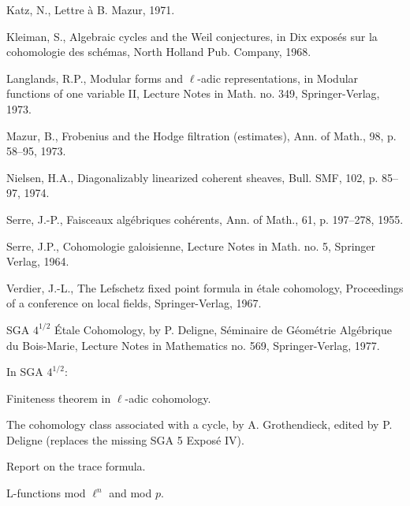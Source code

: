 \documentclass[11pt]{article}
\begin{document}
\begin{enumerate}[label={[\arabic*]},leftmargin=2.5em]
\item Katz, N., Lettre à B. Mazur, 1971.
\item Kleiman, S., Algebraic cycles and the Weil conjectures, in Dix exposés sur la cohomologie des schémas, North Holland Pub. Company, 1968.
\item Langlands, R.P., Modular forms and $\ell$-adic representations, in Modular functions of one variable II, Lecture Notes in Math. no. 349, Springer-Verlag, 1973.
\item Mazur, B., Frobenius and the Hodge filtration (estimates), Ann. of Math., 98, p. 58--95, 1973.
\item Nielsen, H.A., Diagonalizably linearized coherent sheaves, Bull. SMF, 102, p. 85--97, 1974.
\item Serre, J.-P., Faisceaux algébriques cohérents, Ann. of Math., 61, p. 197--278, 1955.
\item Serre, J.P., Cohomologie galoisienne, Lecture Notes in Math. no. 5, Springer Verlag, 1964.
\item Verdier, J.-L., The Lefschetz fixed point formula in étale cohomology, Proceedings of a conference on local fields, Springer-Verlag, 1967.
\end{enumerate}

SGA $4^{1/2}$ Étale Cohomology, by P. Deligne, Séminaire de Géométrie Algébrique du Bois-Marie, Lecture Notes in Mathematics no. 569, Springer-Verlag, 1977.

In SGA $4^{1/2}$:
\begin{description}[leftmargin=3.5em]
\item[Finiteness:] Finiteness theorem in $\ell$-adic cohomology.
\item[Cycle:] The cohomology class associated with a cycle, by A. Grothendieck, edited by P. Deligne (replaces the missing SGA 5 Exposé IV).
\item[Report:] Report on the trace formula.
\item[L-functions:] L-functions mod $\ell^n$ and mod $p$.
\end{description}
\end{document}
